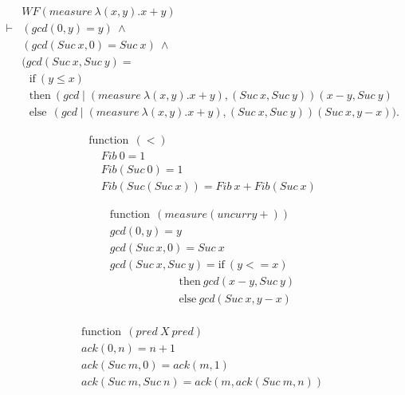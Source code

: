 \begin{slide}
\medskip
\[
\begin{array}{ll} 
 & WF (measure\ \lambda (x,y). x + y) \\
\vdash  &  (gcd(0,y) = y)\ \land \\ 
 & (gcd(Suc\ x,0) = Suc\ x)\ \land \\
 & (gcd(Suc\ x,Suc\ y) = \\
 & {~~~}\mbox{if}\ (y \leq x) \\
 & {~~~}\mbox{then}\ (gcd \!\mid\! (measure\ \lambda (x,y). x + y),
 (Suc\ x,Suc\ y)) (x - y,Suc\ y) \\  
 & {~~~}\mbox{else}\ {~}(gcd \!\mid\! (measure\ \lambda (x,y). x + y),
  (Suc\ x,Suc\ y))(Suc\ x,y - x)).
\end{array}
\]
\end{slide}

\begin{slide}
\[
\begin{array}{l}
\mbox{function}\ \ (<) \\
{~~~~~} Fib\ 0 = 1  \\
{~~~~~} Fib(Suc\  0) = 1 \\
{~~~~~} Fib(Suc(Suc\ x)) = Fib\ x + Fib(Suc\ x)
\end{array}
\]

\end{slide}


\begin{slide}
\[
\begin{array}{l}
\mbox{function}\ \ (measure (uncurry +)) \\
 gcd (0,y)      = y\\
 gcd (Suc\ x, 0) = Suc\  x\\
 gcd (Suc\  x, Suc\  y) = \mbox{if}\ (y <= x) \\
{~~~~~~~~~~~~~~~~~~~~~~~~~~~~}\mbox{then}\ gcd(x-y, Suc\  y)  \\
{~~~~~~~~~~~~~~~~~~~~~~~~~~~~}\mbox{else}\ gcd(Suc\  x, y-x) \\
\end{array}
\]
\end{slide}

\begin{slide}

\[
\begin{array}{l}
\mbox{function}\ \ (pred\ X\ pred) \\
 ack (0,n) = n + 1 \\
 ack (Suc\  m,0) = ack (m,1) \\
 ack (Suc\  m,Suc\  n) = ack (m,ack (Suc\ m,n))
\end{array}
\]

\end{slide}


